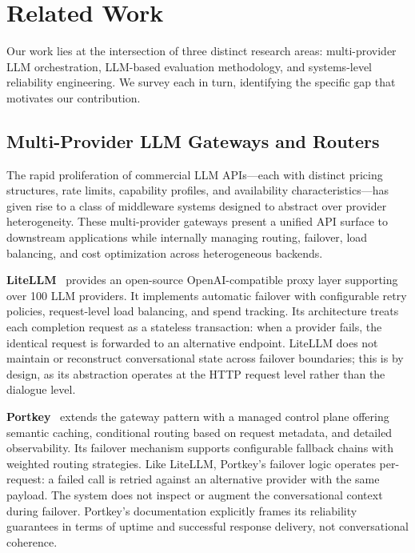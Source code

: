 \section{Related Work}
\label{sec:related}

Our work lies at the intersection of three distinct research areas: multi-provider LLM orchestration, LLM-based evaluation methodology, and systems-level reliability engineering. We survey each in turn, identifying the specific gap that motivates our contribution.

\subsection{Multi-Provider LLM Gateways and Routers}

The rapid proliferation of commercial LLM APIs---each with distinct pricing structures, rate limits, capability profiles, and availability characteristics---has given rise to a class of middleware systems designed to abstract over provider heterogeneity. These multi-provider gateways present a unified API surface to downstream applications while internally managing routing, failover, load balancing, and cost optimization across heterogeneous backends.

\textbf{LiteLLM}~\cite{litellm} provides an open-source OpenAI-compatible proxy layer supporting over 100 LLM providers. It implements automatic failover with configurable retry policies, request-level load balancing, and spend tracking. Its architecture treats each completion request as a stateless transaction: when a provider fails, the identical request is forwarded to an alternative endpoint. LiteLLM does not maintain or reconstruct conversational state across failover boundaries; this is by design, as its abstraction operates at the HTTP request level rather than the dialogue level.

\textbf{Portkey}~\cite{portkey} extends the gateway pattern with a managed control plane offering semantic caching, conditional routing based on request metadata, and detailed observability. Its failover mechanism supports configurable fallback chains with weighted routing strategies. Like LiteLLM, Portkey's failover logic operates per-request: a failed call is retried against an alternative provider with the same payload. The system does not inspect or augment the conversational context during failover. Portkey's documentation explicitly frames its reliability guarantees in terms of uptime and successful response delivery, not conversational coherence.

